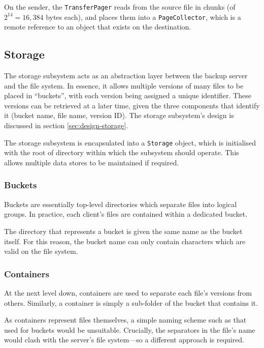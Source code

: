 On the sender, the \verb!TransferPager! reads from the source file in chunks
(of $2^{14} = 16,384$ bytes each), and places them into a \verb!PageCollector!,
which is a remote reference to an object that exists on the destination.

\subsection{Storage}
\label{sec:implementation-server-storage}

The storage subsystem acts as an abstraction layer between the backup server
and the file system. In essence, it allows multiple versions of many files to
be placed in ``buckets'', with each version being assigned a unique identifier.
These versions can be retrieved at a later time, given the three components
that identify it (bucket name, file name, version ID). The storage subsystem's
design is discussed in section \ref{sec:design-storage}.

The storage subsystem is encapsulated into a \verb!Storage! object, which is
initialised with the root of directory within which the subsystem should
operate. This allows multiple data stores to be maintained if required.

\subsubsection{Buckets}
\label{sec:implementation-server-storage-buckets}

Buckets are essentially top-level directories which separate files into logical
groups. In practice, each client's files are contained within a dedicated
bucket.

The directory that represents a bucket is given the same name as the bucket
itself. For this reason, the bucket name can only contain characters which are
valid on the file system.

\subsubsection{Containers}
\label{sec:implementation-server-storage-containers}

At the next level down, containers are used to separate each file's versions
from others. Similarly, a container is simply a sub-folder of the bucket that
contains it.

As containers represent files themselves, a simple naming scheme such as that
used for buckets would be unsuitable. Crucially, the separators in the file's
name would clash with the server's file system---so a different approach is
required.

